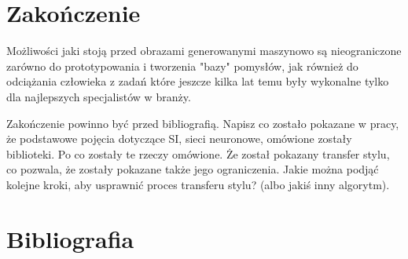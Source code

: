 \documentclass[brudnopis]{xmgr}
\begin{document}
\chapter{Zakończenie}
Możliwości jaki stoją przed obrazami generowanymi maszynowo są nieograniczone zarówno do prototypowania i tworzenia "bazy" pomysłów, jak również do odciążania człowieka z zadań które jeszcze kilka lat temu były wykonalne tylko dla najlepszych specjalistów w branży.

Zakończenie powinno być przed bibliografią. Napisz co zostało pokazane w pracy, że podstawowe pojęcia dotyczące SI, sieci neuronowe, omówione zostały biblioteki. Po co zostały te rzeczy omówione. Że został pokazany transfer stylu, co pozwala, że zostały pokazane także jego ograniczenia. Jakie można podjąć kolejne kroki, aby usprawnić proces transferu stylu? (albo jakiś inny algorytm). 


\chapter{Bibliografia}
\end{document}
